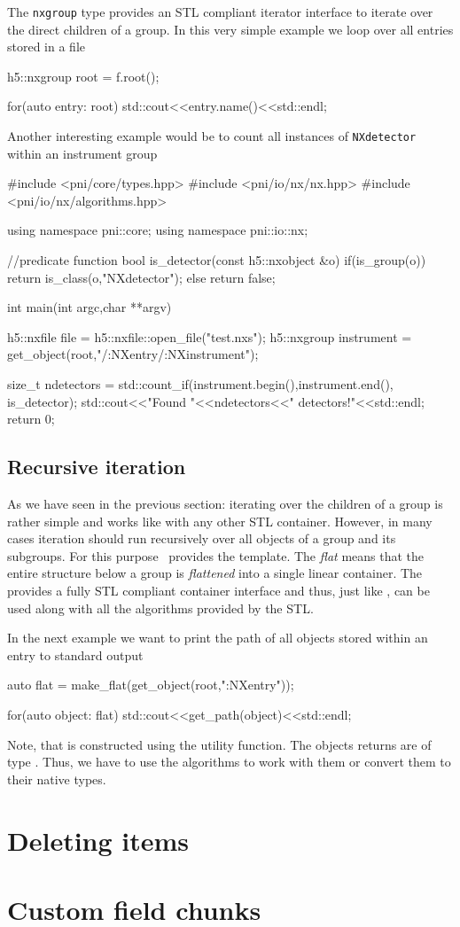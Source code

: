 The \texttt{nxgroup} type provides an STL compliant iterator interface to iterate
over the direct children of a group. In this very simple example we loop over 
all entries stored in a file
\begin{cppcode}
h5::nxgroup root = f.root();

for(auto entry: root)
    std::cout<<entry.name()<<std::endl;
\end{cppcode}
Another interesting example would be to count all instances of \texttt{NXdetector} 
within an instrument group
\begin{cppcode}
#include <pni/core/types.hpp>
#include <pni/io/nx/nx.hpp>
#include <pni/io/nx/algorithms.hpp>

using namespace pni::core;
using namespace pni::io::nx;

//predicate function
bool is_detector(const h5::nxobject &o)
{
    if(is_group(o)) return is_class(o,"NXdetector");
    else return false;
}

int main(int argc,char **argv)
{
    h5::nxfile file = h5::nxfile::open_file("test.nxs");
    h5::nxgroup instrument = get_object(root,"/:NXentry/:NXinstrument");

    size_t ndetectors = std::count_if(instrument.begin(),instrument.end(),
                                      is_detector);
    std::cout<<"Found "<<ndetectors<<" detectors!"<<std::endl;
    return 0;
}
\end{cppcode}

\subsection{Recursive iteration}
As we have seen in the previous section: iterating over the children of a group
is rather simple and works like with any other STL container. However, in many
cases iteration should run recursively over all objects of a group and its
subgroups. For this purpose \libpniio\ provides the  template. 
The \emph{flat} means that the entire structure below a group is
\emph{flattened} into a single linear container. The  provides 
a fully STL compliant container interface and thus, just like \nxgroup, can be
used along with all the algorithms provided by the STL. 

In the next example we want to print the path of all objects stored within an
entry to standard output
\begin{cppcode}
auto flat = make_flat(get_object(root,":NXentry"));

for(auto object: flat)
    std::cout<<get_path(object)<<std::endl;
\end{cppcode}
Note, that  is constructed using the  utility
function. The objects  returns are of type \nxobject. Thus, we
have to use the algorithms to work with them or convert them to their native
types.

\section{Deleting items}



\section{Custom field chunks}\label{section:field_chunks}


